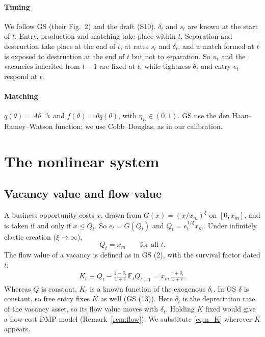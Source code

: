 \documentclass[authoryear, review, 12pt]{elsarticle}
\begin{document}
\paragraph{Timing}
We follow GS (their Fig.~2) and the draft (S10). $\delta_t$ and $s_t$ are known at the
start of $t$. Entry, production and matching take place within $t$. Separation and
destruction take place at the end of $t$, at rates $s_t$ and $\delta_t$, and a match formed at $t$ is exposed
to destruction at the end of $t$ but not to separation. So $u_t$ and the vacancies
inherited from $t-1$ are fixed at $t$, while tightness $\theta_t$ and entry $e_t$ respond
at $t$.

\paragraph{Matching}
$q(\theta)=A\theta^{-\eta_L}$ and $f(\theta)=\theta q(\theta)$, with $\eta_L\in(0,1)$. GS
use the den Haan--Ramey--Watson function; we use Cobb--Douglas, as in our calibration.

\section{The nonlinear system}

\subsection{Vacancy value and flow value}

A business opportunity costs $x$, drawn from $G(x)=(x/x_m)^\xi$ on $[0,x_m]$, and is
taken if and only if $x\le Q_t$. So $e_t=G(Q_t)$ and $Q_t=e_t^{1/\xi}x_m$. Under infinitely
elastic creation ($\xi\to\infty$),
\begin{equation}\label{eq:n_fe}
	Q_t=x_m\qquad\text{for all }t .
\end{equation}
The flow value of a vacancy is defined as in GS (2), with the survival factor dated $t$:
\begin{align}\label{eq:n_K}
	K_t\equiv Q_t-\frac{1-\delta_t}{1+r}\,\mathbb{E}_tQ_{t+1}=x_m\,\frac{r+\delta_t}{1+r}.
\end{align}
Whereas $Q$ is constant, $K_t$ is a known function of the exogenous $\delta_t$. In GS
$\delta$ is constant, so free entry fixes $K$ as well (GS (13)). Here $\delta_t$ is the
depreciation rate of the vacancy asset, so its flow value moves with $\delta_t$. Holding
$K$ fixed would give a flow-cost DMP model (Remark~\ref{rem:flow}). We substitute
\eqref{eq:n_K} wherever $K$ appears.
\end{document}
